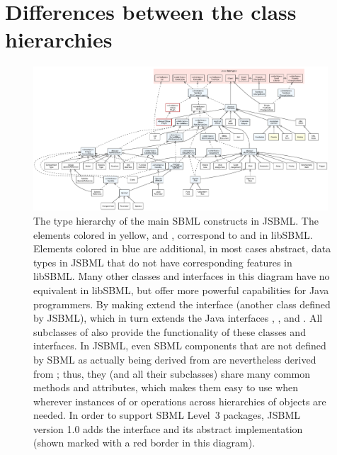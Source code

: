 

\section{Differences between the class hierarchies}
\label{sec:extended-type-hierarchy}

\begin{figure}
  \centering
  \includegraphics[width=0.98\textwidth]{../common/img/FullTypeHierarchy.pdf}
  \caption[The type hierarchy of the main SBML constructs in JSBML]{The
    type hierarchy of the main SBML constructs in JSBML. The elements
    colored in yellow,  and , correspond to
     and  in libSBML. Elements
    colored in blue are additional, in most cases abstract, data types in
    JSBML that do not have corresponding features in libSBML. Many other
    classes and interfaces in this diagram have no equivalent in libSBML,
    but offer more powerful capabilities for Java programmers. By making
    \SBase extend the interface \TreeNodeWithChangeSupport (another class
    defined by JSBML), which in turn extends the Java interfaces
    , , and \TreeNode. All subclasses
    of  also provide the functionality of these classes and
    interfaces. In JSBML, even SBML components that are not defined by
    SBML as actually being derived from  are nevertheless
    derived from \TreeNodeWithChangeSupport; thus, they (and all their
    subclasses) share many common methods and attributes, which makes them
    easy to use when wherever instances of \TreeNode or operations across
    hierarchies of objects are needed. In order to support SBML Level~3
    packages, JSBML version 1.0 adds the interface \SBasePlugin and its
    abstract implementation \AbstractSBasePlugin (shown marked
    with a red border in this diagram).} 
  \label{fig:TypeHierarchy}
\end{figure}

